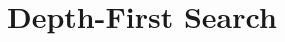\begin{comment}
\section{SML Code} 

\paragraph{Basic BFS.}
The following SML code for BFS mirrors the pseudo-code in the notes.
It uses a table that maps each vertex to a set that
contains its (out-)neighbors.  The function $\cfun~\ttt{N}~G~F$
implements $N_G(F)$ by first using \ttt{extract} to get a table
with only the vertices in $F$. That is, the resulting table maps each
vertex in $F$ to its neighbors.  Next, it combines all the neighbors
of $F$ into a single set.    Recall that \ttt{Table.reduce} $f$
combines the values in the table with the function $f$.

\begin{small}

\end{small}

\paragraph{Generating a BFS Tree.}

The following code generates a BFS tree.  It represents the visited
set $X$ and the frontier $F$ as table that map each vertex in the
visited set or frontier to their parent in the BFS tree (i.e. who
visited them).  The function \ttt{outEdges} returns the out edges of
$v$ or an empty set if $v$ is not found.  The $N_G(F)$ function not
only returns the neighbors for every vertex $v \in F$, but also tags
each neighbor with the vertex $v$ they came from.  In particular
\ttt{tagNeighbors} tags all neighbors with $v$, and then a
\ttt{Table.reduce} is used to merge all the tables of tagged
neighbors.  The \ttt{merge} used in the reduce takes the first
argument if there are two equal keys, which happens in BFS when a
vertex has multiple potential parents.

\begin{small}

\end{small}
\end{comment}

\section{Depth-First Search}
\label{ch:dfs}

